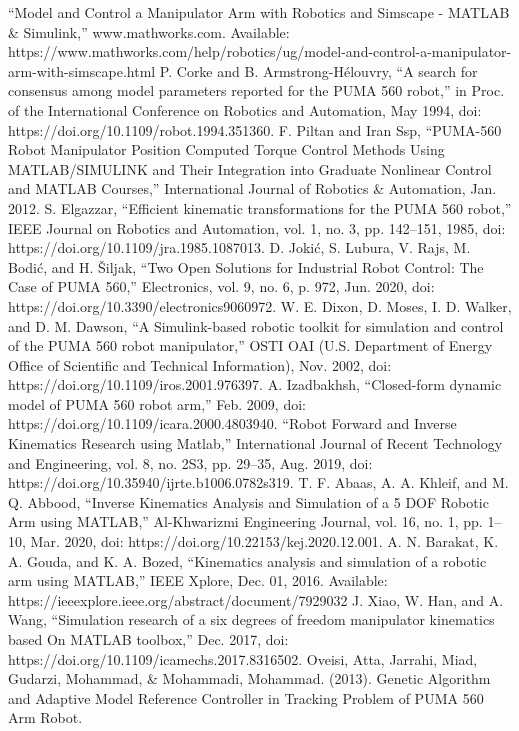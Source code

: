 \documentclass[conference]{IEEEtran}
\begin{document}
\pagebreak
\begin{thebibliography}{00}
     ``Model and Control a Manipulator Arm with Robotics and Simscape - MATLAB \& Simulink,'' www.mathworks.com. Available: https://www.mathworks.com/help/robotics/ug/model-and-control-a-manipulator-arm-with-simscape.html
     P. Corke and B. Armstrong-Hélouvry, ``A search for consensus among model parameters reported for the PUMA 560 robot,'' in Proc. of the International Conference on Robotics and Automation, May 1994, doi: https://doi.org/10.1109/robot.1994.351360.
     F. Piltan and Iran Ssp, ``PUMA-560 Robot Manipulator Position Computed Torque Control Methods Using MATLAB/SIMULINK and Their Integration into Graduate Nonlinear Control and MATLAB Courses,'' International Journal of Robotics \& Automation, Jan. 2012.
     S. Elgazzar, ``Efficient kinematic transformations for the PUMA 560 robot,'' IEEE Journal on Robotics and Automation, vol. 1, no. 3, pp. 142–151, 1985, doi: https://doi.org/10.1109/jra.1985.1087013.
     D. Jokić, S. Lubura, V. Rajs, M. Bodić, and H. Šiljak, ``Two Open Solutions for Industrial Robot Control: The Case of PUMA 560,'' Electronics, vol. 9, no. 6, p. 972, Jun. 2020, doi: https://doi.org/10.3390/electronics9060972.
     W. E. Dixon, D. Moses, I. D. Walker, and D. M. Dawson, ``A Simulink-based robotic toolkit for simulation and control of the PUMA 560 robot manipulator,'' OSTI OAI (U.S. Department of Energy Office of Scientific and Technical Information), Nov. 2002, doi: https://doi.org/10.1109/iros.2001.976397.
     A. Izadbakhsh, ``Closed-form dynamic model of PUMA 560 robot arm,'' Feb. 2009, doi: https://doi.org/10.1109/icara.2000.4803940.
     ``Robot Forward and Inverse Kinematics Research using Matlab,'' International Journal of Recent Technology and Engineering, vol. 8, no. 2S3, pp. 29–35, Aug. 2019, doi: https://doi.org/10.35940/ijrte.b1006.0782s319.
     T. F. Abaas, A. A. Khleif, and M. Q. Abbood, ``Inverse Kinematics Analysis and Simulation of a 5 DOF Robotic Arm using MATLAB,'' Al-Khwarizmi Engineering Journal, vol. 16, no. 1, pp. 1–10, Mar. 2020, doi: https://doi.org/10.22153/kej.2020.12.001.
     A. N. Barakat, K. A. Gouda, and K. A. Bozed, ``Kinematics analysis and simulation of a robotic arm using MATLAB,'' IEEE Xplore, Dec. 01, 2016. Available: https://ieeexplore.ieee.org/abstract/document/7929032
     J. Xiao, W. Han, and A. Wang, ``Simulation research of a six degrees of freedom manipulator kinematics based On MATLAB toolbox,'' Dec. 2017, doi: https://doi.org/10.1109/icamechs.2017.8316502.
     Oveisi, Atta, Jarrahi, Miad, Gudarzi, Mohammad, \& Mohammadi, Mohammad. (2013). Genetic Algorithm and Adaptive Model Reference Controller in Tracking Problem of PUMA 560 Arm Robot.
\end{thebibliography}    
\vspace{12pt}
\color{red}
\end{document}
